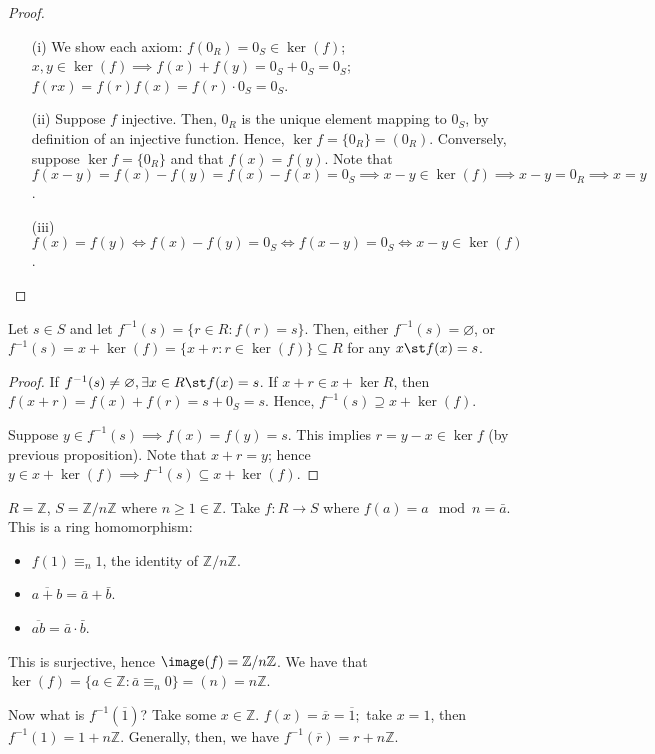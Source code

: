 \documentclass[12pt,oneside]{article}
\begin{document}
\begin{proof}
  \begin{itemize}
    \item[(i)] We show each axiom: $f(0_R) = 0_S \in \ker(f)$; $x,y \in \ker(f) \implies f(x)  + f(y) = 0_S + 0_S = 0_S$; $f(rx) = f(r)f(x) = f(r) \cdot 0_S = 0_S$.
    \item[(ii)] Suppose $f$ injective. Then, $0_R$ is the unique element mapping to $0_S$, by definition of an injective function. Hence, $\ker f = \{0_R\} = (0_R)$. Conversely, suppose $\ker f = \{0_R\}$ and that $f(x) = f(y)$. Note that $f(x - y) = f(x) - f(y) = f(x) - f(x) = 0_S \implies x - y \in \ker (f) \implies x - y = 0_R \implies x = y$.
    \item[(iii)] $f(x) = f(y) \iff f(x) - f(y) = 0_S \iff f(x - y) = 0_S \iff x - y \in \ker (f)$.
  \end{itemize}
\end{proof}

\begin{corollary}
  Let $s \in S$ and let $f^{-1}(s) = \{r \in R : f(r) = s\}.$ Then, either $f^{-1}(s) = \varnothing$, or $f^{-1}(s) = x + \ker (f) = \{x + r : r \in \ker (f)\} \subseteq R$ for any $x \st f(x) = s$.
\end{corollary}

\begin{proof}
  If $f^{-1}(s) \neq \varnothing, \exists x \in R \st f(x) = s$. If $x + r \in x + \ker R$, then $f(x + r) = f(x) + f(r) = s + 0_S = s$. Hence, $f^{-1}(s) \supseteq x + \ker (f)$.

  Suppose $y \in f^{-1}(s) \implies f(x) = f(y) = s$. This implies $r = y - x \in \ker f$ (by previous proposition). Note that $x+r = y$; hence $y \in x + \ker (f) \implies f^{-1}(s) \subseteq x + \ker (f)$.
\end{proof}

\begin{example}
  $R = \mathbb{Z}$, $S = \mathbb{Z}/n \mathbb{Z}$ where $n \geq 1 \in \mathbb{Z}$. Take $f : R \to S$ where $f(a) = a \mod n = \bar{a}$. This is a ring homomorphism:
  \begin{itemize}
    \item $f(1) \equiv_n 1$, the identity of $\mathbb{Z}/n \mathbb{Z}$.
    \item $\overline{a + b} = \bar{a} + \bar {b}$.
    \item $\overline{ab} = \bar{a} \cdot \bar{b}$.
  \end{itemize}
  This is surjective, hence $\image (f) = \mathbb{Z}/n\mathbb{Z}$. We have that $\ker (f) = \{a \in \mathbb{Z} : \bar{a} \equiv_n 0\} = (n) = n \mathbb{Z}$.

  Now what is $f^{-1}(\overline{1})$? Take some $x \in \mathbb{Z}$. $f(x) = \overline{x} = \overline{1};$ take $x = 1$, then $f^{-1}(1) = 1 + n \mathbb{Z}$. Generally, then, we have $f^{-1}(\overline{r}) = r + n \mathbb{Z}$.
\end{example}
\end{document}
